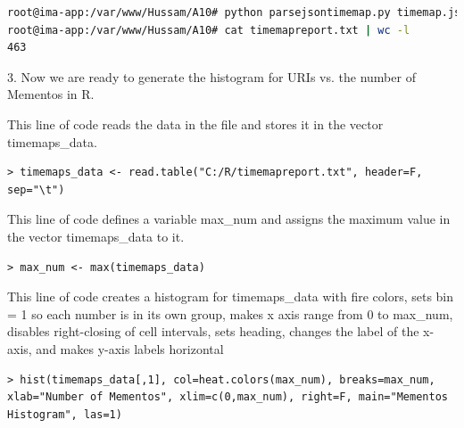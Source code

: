 \documentclass[a4paper, 11pt]{article}
\begin{document}


\begin{lstlisting}[language=bash, breakatwhitespace=〈false), label=Command, caption=Running parsejsontimemap.py]
root@ima-app:/var/www/Hussam/A10# python parsejsontimemap.py timemap.json timemapreport.txt
root@ima-app:/var/www/Hussam/A10# cat timemapreport.txt | wc -l
463
\end{lstlisting}

3. Now we are ready to generate the histogram for URIs vs. the number of Mementos in R.

This line of code reads the data in the file and stores it in the vector timemaps\_data.
\begin{lstlisting}
> timemaps_data <- read.table("C:/R/timemapreport.txt", header=F, sep="\t")
\end{lstlisting}

This line of code defines a variable max\_num and assigns the maximum value in the vector timemaps\_data to it.
\begin{lstlisting}
> max_num <- max(timemaps_data)
\end{lstlisting}

This line of code creates a histogram for timemaps\_data  with fire colors, sets bin = 1 so each number is in its own group, makes x axis range from 0 to max\_num, disables right-closing of cell intervals, sets heading, changes the label of the x-axis, and makes y-axis labels horizontal
\begin{lstlisting}
> hist(timemaps_data[,1], col=heat.colors(max_num), breaks=max_num, xlab="Number of Mementos", xlim=c(0,max_num), right=F, main="Mementos Histogram", las=1)
\end{lstlisting}
\end{document}
